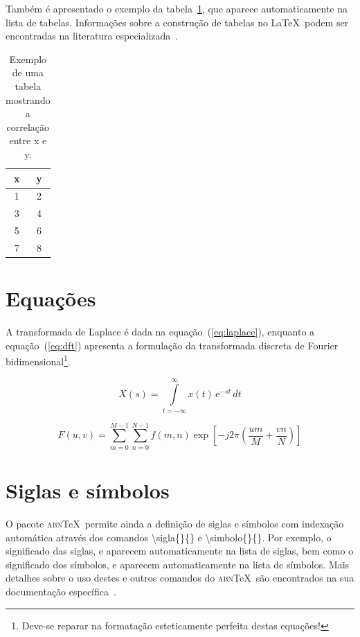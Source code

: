
Tamb\'em \'e apresentado o exemplo da tabela~\ref{tab:correlacao}, que aparece automaticamente na lista de tabelas. Informa\c{c}\~oes sobre a constru\c{c}\~ao de tabelas no \LaTeX\ podem ser encontradas na literatura especializada~\cite{Lamport1986,Buerger1989,Kopka2003,Mittelbach2004}.

\begin{table}[!htb]
	\centering
	\caption[Exemplo de uma tabela]{Exemplo de uma tabela mostrando a correla\c{c}\~ao entre x e y.}
	\label{tab:correlacao}
	\begin{tabular}{cc}
		\hline 
		x & y \\
		\hline
		1 & 2 \\
		3 & 4 \\
		5 & 6 \\
		7 & 8 \\
		\hline 
	\end{tabular}
\end{table}

\section{Equa\c{c}\~oes}

A transformada de Laplace \'e dada na equa\c{c}\~ao~(\ref{eq:laplace}), enquanto a equa\c{c}\~ao~(\ref{eq:dft}) apresenta a formula\c{c}\~ao da transformada discreta de Fourier bidimensional\footnote{Deve-se reparar na formata\c{c}\~ao esteticamente perfeita destas equa\c{c}\~oes!}.

\begin{equation}
X(s) = \int\limits_{t = -\infty}^{\infty} x(t) \, \text{e}^{-st} \, dt
\label{eq:laplace}
\end{equation}

\begin{equation}
F(u, v) = \sum_{m = 0}^{M - 1} \sum_{n = 0}^{N - 1} f(m, n) \exp \left[ -j 2 \pi \left( \frac{u m}{M} + \frac{v n}{N} \right) \right]
\label{eq:dft}
\end{equation}

\section{Siglas e s\'imbolos}

O pacote \textsc{abn}\TeX\ permite ainda a defini\c{c}\~ao de siglas e s\'imbolos com indexa\c{c}\~ao autom\'atica atrav\'es dos comandos {\ttfamily \textbackslash sigla\{\}\{\}} e {\ttfamily \textbackslash simbolo\{\}\{\}}. Por exemplo, o significado das siglas, e aparecem automaticamente na lista de siglas, bem como o significado dos s\'imbolos, e aparecem automaticamente na lista de s\'imbolos. Mais detalhes sobre o uso destes e outros comandos do \textsc{abn}\TeX\ s\~ao encontrados na sua documenta\c{c}\~ao espec\'ifica~\cite{abnTeX2009}.

